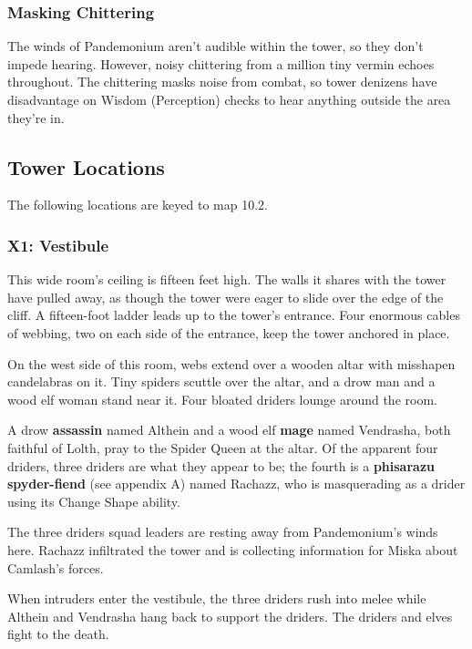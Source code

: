 \documentclass[10pt,a4paper,twoside,bg=print,twocolumn,openany,nodeprecatedcode]{dndbook}
\begin{document}
\subsubsection{Masking Chittering}
The winds of Pandemonium aren't audible within the tower, so they don't impede hearing. However, noisy chittering from a million tiny vermin echoes throughout. The chittering masks noise from combat, so tower denizens have disadvantage on Wisdom (Perception) checks to hear anything outside the area they're in.

\subsection{Tower Locations}
The following locations are keyed to map 10.2.

\subsubsection{X1: Vestibule}
\begin{DndReadAloud}{}
This wide room's ceiling is fifteen feet high. The walls it shares with the tower have pulled away, as though the tower were eager to slide over the edge of the cliff. A fifteen-foot ladder leads up to the tower's entrance. Four enormous cables of webbing, two on each side of the entrance, keep the tower anchored in place.

On the west side of this room, webs extend over a wooden altar with misshapen candelabras on it. Tiny spiders scuttle over the altar, and a drow man and a wood elf woman stand near it. Four bloated driders lounge around the room.

\end{DndReadAloud}

A drow \textbf{assassin} named Althein and a wood elf \textbf{mage} named Vendrasha, both faithful of Lolth, pray to the Spider Queen at the altar. Of the apparent four driders, three driders are what they appear to be; the fourth is a \textbf{phisarazu spyder-fiend} (see appendix A) named Rachazz, who is masquerading as a drider using its Change Shape ability.

The three driders squad leaders are resting away from Pandemonium's winds here. Rachazz infiltrated the tower and is collecting information for Miska about Camlash's forces.

When intruders enter the vestibule, the three driders rush into melee while Althein and Vendrasha hang back to support the driders. The driders and elves fight to the death.
\end{document}
